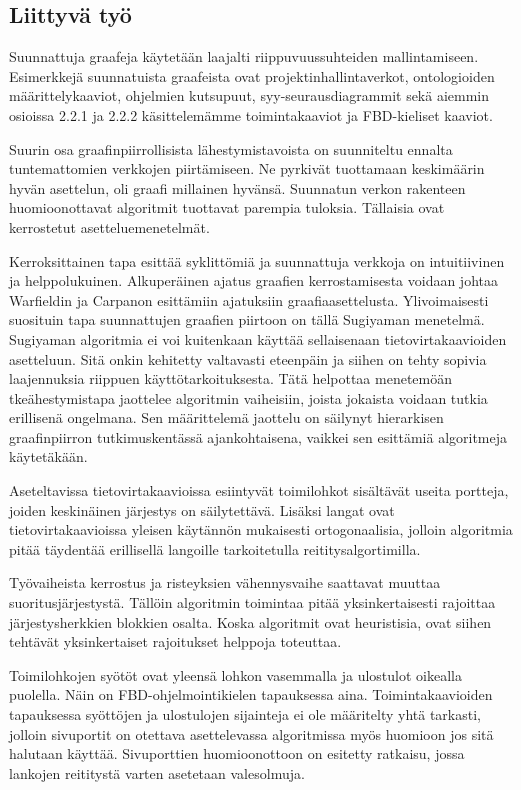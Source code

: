 \documentclass[finnish,12pt]{article}
\begin{document}
	\subsection{Liittyvä työ}

Suunnattuja graafeja käytetään laajalti riippuvuussuhteiden mallintamiseen.
Esimerkkejä suunnatuista graafeista ovat projektinhallintaverkot, ontologioiden määrittelykaaviot, ohjelmien kutsupuut, syy-seurausdiagrammit sekä aiemmin osioissa 2.2.1 ja 2.2.2 käsittelemämme toimintakaaviot ja FBD-kieliset kaaviot.

Suurin osa graafinpiirrollisista lähestymistavoista on suunniteltu ennalta tuntemattomien verkkojen piirtämiseen.
Ne pyrkivät tuottamaan keskimäärin hyvän asettelun, oli graafi millainen hyvänsä.
Suunnatun verkon rakenteen huomioonottavat algoritmit tuottavat parempia tuloksia.
Tällaisia ovat kerrostetut asetteluemenetelmät.

Kerroksittainen tapa esittää syklittömiä ja suunnattuja verkkoja on intuitiivinen ja helppolukuinen.
Alkuperäinen ajatus graafien kerrostamisesta voidaan johtaa Warfieldin \cite{RefWorks:58} ja Carpanon \cite{RefWorks:57} esittämiin ajatuksiin graafiaasettelusta.
Ylivoimaisesti suosituin tapa suunnattujen graafien piirtoon on tällä Sugiyaman menetelmä. \cite{RefWorks:9}
Sugiyaman algoritmia ei voi kuitenkaan käyttää sellaisenaan tietovirtakaavioiden asetteluun.
Sitä onkin kehitetty valtavasti eteenpäin ja siihen on tehty sopivia laajennuksia riippuen käyttötarkoituksesta.
Tätä helpottaa menetemöän tkeähestymistapa jaottelee algoritmin vaiheisiin, joista jokaista voidaan tutkia erillisenä ongelmana.
Sen määrittelemä jaottelu on säilynyt hierarkisen graafinpiirron tutkimuskentässä ajankohtaisena, vaikkei sen esittämiä algoritmeja käytetäkään.

Aseteltavissa tietovirtakaavioissa esiintyvät toimilohkot sisältävät useita portteja, joiden keskinäinen järjestys on säilytettävä.
Lisäksi langat ovat tietovirtakaavioissa yleisen käytännön mukaisesti ortogonaalisia, jolloin algoritmia pitää täydentää erillisellä langoille tarkoitetulla reititysalgortimilla.

Työvaiheista kerrostus ja risteyksien vähennysvaihe saattavat muuttaa suoritusjärjestystä.
Tällöin algoritmin toimintaa pitää yksinkertaisesti rajoittaa järjestysherkkien blokkien osalta.
Koska algoritmit ovat heuristisia, ovat siihen tehtävät yksinkertaiset rajoitukset helppoja toteuttaa.

Toimilohkojen syötöt ovat yleensä lohkon vasemmalla ja ulostulot oikealla puolella.
Näin on FBD-ohjelmointikielen tapauksessa aina.
Toimintakaavioiden tapauksessa syöttöjen ja ulostulojen sijainteja ei ole määritelty yhtä tarkasti, jolloin sivuportit on otettava asettelevassa algoritmissa myös huomioon jos sitä halutaan käyttää.
Sivuporttien huomioonottoon on esitetty ratkaisu, jossa lankojen reititystä varten asetetaan valesolmuja. \cite{RefWorks:51}
\end{document}
